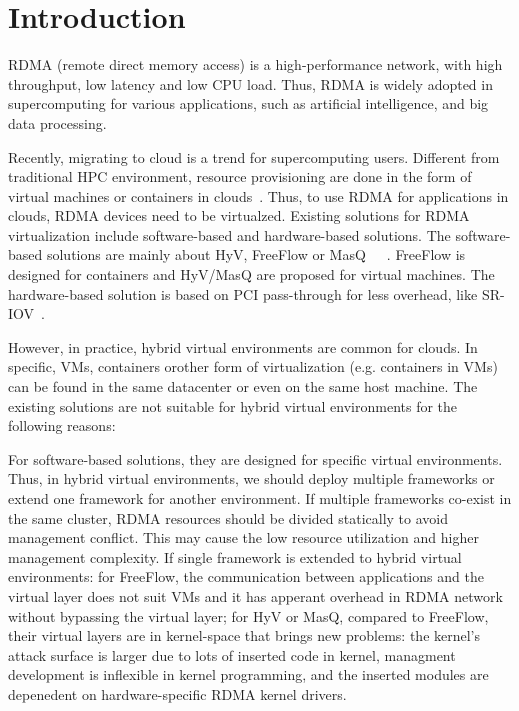 \section{Introduction}
RDMA (remote direct memory access) is a high-performance network,  with high throughput, low latency and low CPU load. Thus, RDMA is widely adopted in supercomputing for various applications,  such as artificial intelligence, and big data processing. 

Recently, migrating to cloud is a trend for supercomputing users. Different from traditional HPC environment, resource provisioning are done in the form of virtual machines or containers in clouds~\cite{hpc-cloud}. Thus, to use RDMA for applications in clouds, RDMA devices need to be virtualzed. Existing solutions for RDMA virtualization include software-based and hardware-based solutions. The software-based solutions are mainly about HyV, FreeFlow or MasQ~\cite{pfefferle2015hybrid}~\cite{kim2019freeflow}~\cite{he2020masq}. FreeFlow is  designed for containers and HyV/MasQ are proposed for virtual machines. The hardware-based solution is based on PCI pass-through for less overhead, like SR-IOV~\cite{sr-iov}. 

However, in practice, hybrid virtual environments are common for clouds. In specific, VMs, containers orother form of virtualization (e.g. containers in VMs) can be found in the same datacenter or even on the same host machine. The existing solutions are not suitable for hybrid virtual environments for the following reasons:

For software-based solutions, they are designed for specific virtual environments. Thus, in hybrid virtual environments, we should deploy multiple frameworks or extend one framework for another environment. If multiple frameworks co-exist in the same cluster, RDMA resources should be divided statically to avoid management conflict. This may cause the low resource utilization and higher management complexity. If single framework is extended to hybrid virtual environments: for FreeFlow, the communication between applications and the virtual layer does not suit VMs and it has apperant overhead in RDMA network without bypassing the virtual layer; for HyV or MasQ, compared to FreeFlow, their virtual layers are in kernel-space that brings new problems: the kernel's attack surface is larger due to lots of inserted code in kernel, managment development is inflexible in kernel programming, and the inserted modules are depenedent on hardware-specific RDMA kernel drivers.

